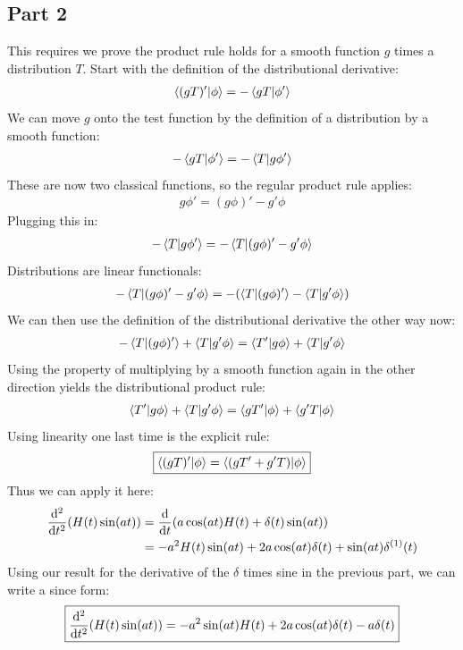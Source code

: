 \documentclass[12pt]{article}
\begin{document}
\subsection*{Part 2}
This requires we prove the product rule holds for a smooth function $g$ times a distribution $T$. Start with the definition of the distributional derivative:
\begin{align*}
  \ip{(gT)'}{\phi}=-\ip{gT}{\phi'}
\end{align*}
We can move $g$ onto the test function by the definition of a distribution by a smooth function:
\begin{align*}
  -\ip{gT}{\phi'}=-\ip{T}{g\phi'}
\end{align*}
These are now two classical functions, so the regular product rule applies:
\begin{align*}
  g\phi'=(g\phi)'-g'\phi
\end{align*}
Plugging this in:
\begin{align*}
  -\ip{T}{g\phi'}=-\ip{T}{(g\phi)'-g'\phi}
\end{align*}
Distributions are linear functionals:
\begin{align*}
  -\ip{T}{(g\phi)'-g'\phi}=-\qty(\ip{T}{(g\phi)'}-\ip{T}{g'\phi})
\end{align*}
We can then use the definition of the distributional derivative the other way now:
\begin{align*}
  -\ip{T}{(g\phi)'}+\ip{T}{g'\phi}=\ip{T'}{g\phi}+\ip{T}{g'\phi}
\end{align*}
Using the property of multiplying by a smooth function again in the other direction yields the distributional product rule:
\begin{align*}
  \ip{T'}{g\phi}+\ip{T}{g'\phi}=\ip{gT'}{\phi}+\ip{g'T}{\phi}
\end{align*}
Using linearity one last time is the explicit rule:
\begin{align*}
  \boxed{\ip{(gT)'}{\phi}=\ip{(gT'+g'T)}{\phi}}
\end{align*}
Thus we can apply it here:
\begin{align*}
  \dv[2]{t}\qty(H(t)\sin(at))&=\dv{t}\qty(a\cos(at)H(t)+\delta(t)\sin(at))\\
  &=-a^2H(t)\sin(at)+2a\cos(at)\delta(t)+\sin(at)\delta^{(1)}(t)
\end{align*}
Using our result for the derivative of the $\delta$ times sine in the previous part, we can write a since form:
\begin{align}
  \boxed{
    \dv[2]{t}\qty(H(t)\sin(at))=-a^2\sin(at)H(t)+2a\cos(at)\delta(t)-a\delta(t)
  }
\end{align}
\end{document}
